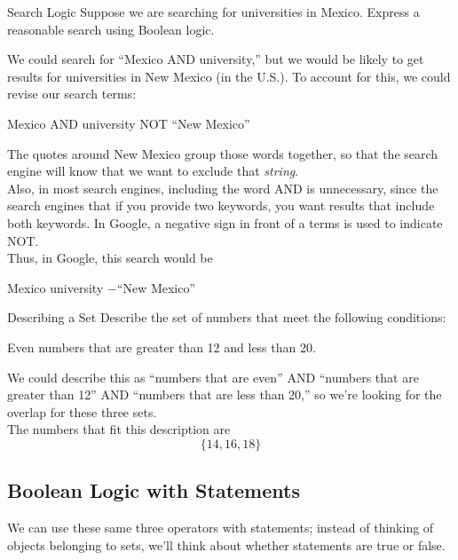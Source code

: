 \begin{example}[https://www.youtube.com/watch?v=E_BhHaTb1pw]{Search Logic}
Suppose we are searching for universities in Mexico.  Express a reasonable search using Boolean logic.

\sol
We could search for ``Mexico AND university,'' but we would be likely to get results for universities in New Mexico (in the U.S.).  To account for this, we could revise our search terms:
\begin{center}
Mexico AND university NOT ``New Mexico''
\end{center}
The quotes around New Mexico group those words together, so that the search engine will know that we want to exclude that \textit{string}.\\

Also, in most search engines, including the word AND is unnecessary, since the search engines that if you provide two keywords, you want results that include both keywords.  In Google, a negative sign in front of a terms is used to indicate NOT.\\

Thus, in Google, this search would be
\begin{center}
Mexico university $-$``New Mexico''
\end{center}
\end{example}

\begin{example}[https://www.youtube.com/watch?v=G-1JBcYqz_o]{Describing a Set}
Describe the set of numbers that meet the following conditions:
\begin{center}
Even numbers that are greater than 12 and less than 20.
\end{center}

\sol
We could describe this as ``numbers that are even'' AND ``numbers that are greater than 12'' AND ``numbers that are less than 20,'' so we're looking for the overlap for these three sets.\\

The numbers that fit this description are \[\boxed{\{14,16,18\}}\]
\end{example}

\subsection{Boolean Logic with Statements}
We can use these same three operators with statements; instead of thinking of objects belonging to sets, we'll think about whether statements are true or false.\\

